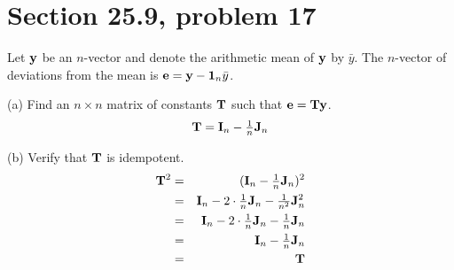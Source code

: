 \section{Section 25.9, problem 17}
Let $\bf y$ be an $n$-vector and denote the arithmetic mean of $\bf y$
by $\bar y$. The $n$-vector of deviations from the mean is
${\bf e}={\bf y}-{\bf 1}_n\bar y$.

\bigskip
\noindent
(a) Find an $n\times n$ matrix of constants $\bf T$
such that ${\bf e}={\bf Ty}$.
$${\bf T}={\bf I}_n-\hbox{$1\over n$}{\bf J}_n$$

\bigskip
\noindent
(b) Verify that $\bf T$ is idempotent.
\begin{eqnarray*}
{\bf T}^2&=&({\bf I}_n-\hbox{$1\over n$}{\bf J}_n)^2\\
&=&{\bf I}_n-2\cdot\hbox{$1\over n$}{\bf J}_n-\hbox{$1\over n^2$}{\bf J}_n^2\\
&=&{\bf I}_n-2\cdot\hbox{$1\over n$}{\bf J}_n-\hbox{$1\over n$}{\bf J}_n\\
&=&{\bf I}_n-\hbox{$1\over n$}{\bf J}_n\\
&=&{\bf T}
\end{eqnarray*}
